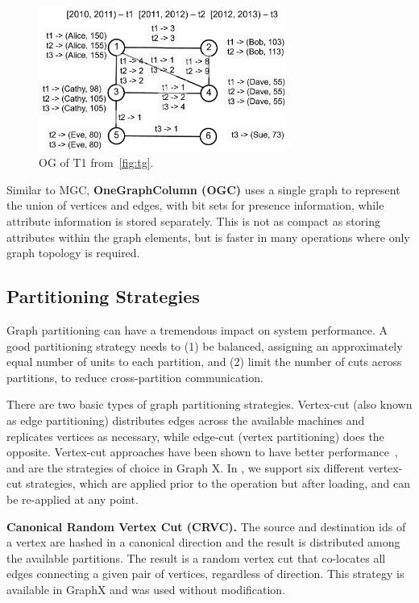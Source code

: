 \begin{figure}[t!]
\includegraphics[width=3.2in]{figs/og.pdf}
\caption{OG of T1 from~\ref{fig:tg}.}
\label{fig:og}
\end{figure}

Similar to MGC, {\bf OneGraphColumn (OGC)} uses a single graph to
represent the union of vertices and edges, with bit sets for presence
information, while attribute information is stored separately.  This
is not as compact as storing attributes within the graph elements, but
is faster in many operations where only graph topology is required.

\subsection{Partitioning Strategies}  
\label{sec:sys:partition}

Graph partitioning can have a tremendous impact on system performance.
A good partitioning strategy needs to (1) be balanced, assigning an
approximately equal number of units to each partition, and (2) limit
the number of cuts across partitions, to reduce cross-partition
communication.  

There are two basic types of graph partitioning strategies. Vertex-cut
(also known as edge partitioning) distributes edges across the
available machines and replicates vertices as necessary, while
edge-cut (vertex partitioning) does the opposite.  Vertex-cut
approaches have been shown to have better
performance~\cite{Gonzalez2012}, and are the strategies of choice in
Graph X.  In \ql, we support six different vertex-cut strategies,
which are applied prior to the operation but after loading, and can be
re-applied at any point.

{\bf Canonical Random Vertex Cut (CRVC).}  The source and destination
ids of a vertex are hashed in a canonical direction and the result is
distributed among the available partitions.  The result is a random
vertex cut that co-locates all edges connecting a given pair of
vertices, regardless of direction.  This strategy is available in
GraphX and was used without modification.

